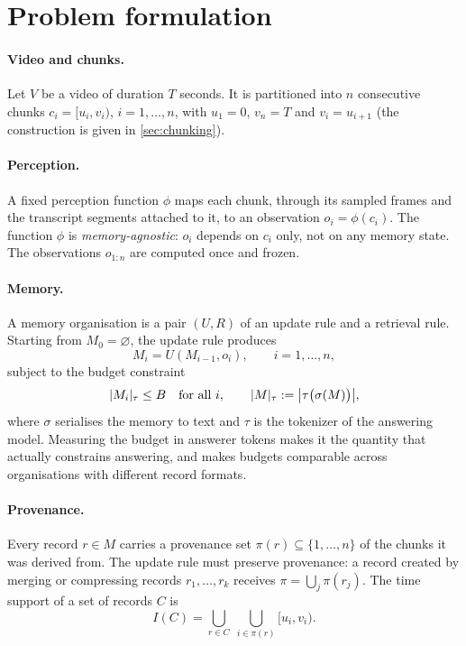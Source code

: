 \section{Problem formulation}\label{sec:formulation}

\paragraph{Video and chunks.}
Let $V$ be a video of duration $T$ seconds. It is partitioned into $n$
consecutive chunks $c_i=[u_i,v_i)$, $i=1,\dots,n$, with $u_1=0$, $v_n=T$ and
$v_i=u_{i+1}$ (the construction is given in \cref{sec:chunking}).

\paragraph{Perception.}
A fixed perception function $\phi$ maps each chunk, through its sampled frames
and the transcript segments attached to it, to an observation
$o_i=\phi(c_i)$. The function $\phi$ is \emph{memory-agnostic}: $o_i$ depends
on $c_i$ only, not on any memory state. The observations
$o_{1:n}$ are computed once and frozen.

\paragraph{Memory.}
A memory organisation is a pair $(U,R)$ of an update rule and a retrieval rule.
Starting from $M_0=\varnothing$, the update rule produces
\begin{equation}
  M_i = U(M_{i-1}, o_i), \qquad i=1,\dots,n,
\end{equation}
subject to the budget constraint
\begin{equation}\label{eq:budget}
  \lvert M_i \rvert_{\tau} \le B \quad\text{for all } i,
  \qquad \lvert M \rvert_{\tau} := \bigl|\tau\bigl(\sigma(M)\bigr)\bigr|,
\end{equation}
where $\sigma$ serialises the memory to text and $\tau$ is the tokenizer of
the answering model. Measuring the budget in answerer tokens makes it the
quantity that actually constrains answering, and makes budgets comparable
across organisations with different record formats.

\paragraph{Provenance.}
Every record $r\in M$ carries a provenance set $\pi(r)\subseteq\{1,\dots,n\}$
of the chunks it was derived from. The update rule must preserve provenance:
a record created by merging or compressing records $r_1,\dots,r_k$ receives
$\pi=\bigcup_j\pi(r_j)$. The time support of a set of records $C$ is
\begin{equation}
  I(C) = \bigcup_{r\in C}\;\bigcup_{i\in\pi(r)} [u_i,v_i).
\end{equation}

